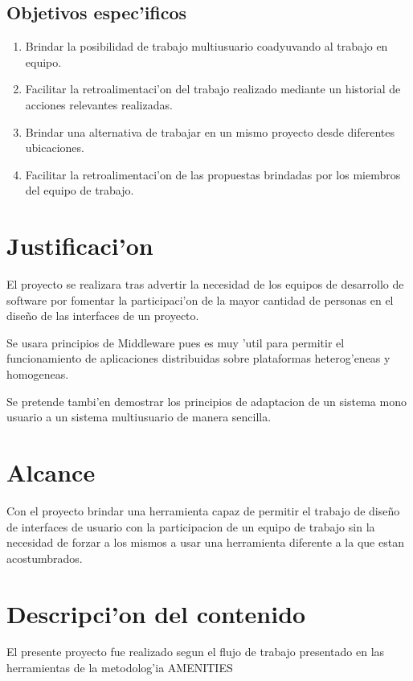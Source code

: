 \subsection{Objetivos espec'ificos}

\begin{enumerate}
	\item Brindar la posibilidad de trabajo multiusuario coadyuvando al trabajo en equipo.
	\item Facilitar la retroalimentaci'on del trabajo realizado mediante un historial de acciones relevantes realizadas. 
	\item Brindar una alternativa de trabajar en un mismo proyecto desde diferentes ubicaciones.
	\item Facilitar la retroalimentaci'on de las propuestas brindadas por los miembros del equipo de trabajo.
\end{enumerate}

\section{Justificaci'on}

El proyecto se realizara tras advertir la necesidad de los equipos de desarrollo de software por fomentar la participaci'on de la mayor cantidad de personas en el dise\~no de las interfaces de un proyecto.

Se usara principios de Middleware pues es muy 'util para permitir el funcionamiento de aplicaciones distribuidas sobre plataformas heterog'eneas y homogeneas.

Se pretende tambi'en demostrar los principios de adaptacion de un sistema mono usuario a un sistema multiusuario de manera sencilla. 

\section{Alcance}

Con el proyecto brindar una herramienta capaz de permitir el trabajo de dise\~no de interfaces de usuario con la participacion de un equipo de trabajo sin la necesidad de forzar a los mismos a usar una herramienta diferente a la que estan acostumbrados.

\section{Descripci'on del contenido}

El presente proyecto fue realizado segun el flujo de trabajo presentado en las herramientas de la metodolog'ia AMENITIES
